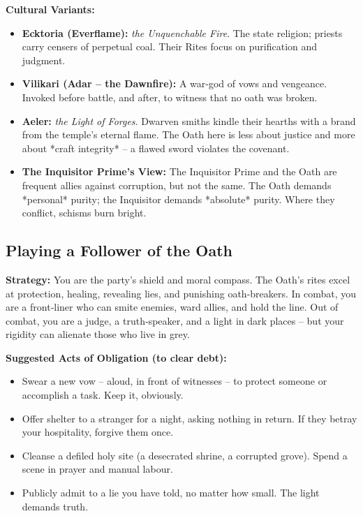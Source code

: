 \documentclass[10pt,a5paper]{book}
\begin{document}
\textbf{Cultural Variants:}
\begin{itemize}
    \item \textbf{Ecktoria (Everflame):} \textit{the Unquenchable Fire}. The state religion; priests carry censers of perpetual coal. Their Rites focus on purification and judgment.
    \item \textbf{Vilikari (Adar – the Dawnfire):} A war‑god of vows and vengeance. Invoked before battle, and after, to witness that no oath was broken.
    \item \textbf{Aeler:} \textit{the Light of Forges}. Dwarven smiths kindle their hearths with a brand from the temple’s eternal flame. The Oath here is less about justice and more about *craft integrity* – a flawed sword violates the covenant.
    \item \textbf{The Inquisitor Prime’s View:} The Inquisitor Prime and the Oath are frequent allies against corruption, but not the same. The Oath demands *personal* purity; the Inquisitor demands *absolute* purity. Where they conflict, schisms burn bright.
\end{itemize}

\subsection*{Playing a Follower of the Oath}

\textbf{Strategy:} You are the party’s shield and moral compass. The Oath’s rites excel at protection, healing, revealing lies, and punishing oath‑breakers. In combat, you are a front‑liner who can smite enemies, ward allies, and hold the line. Out of combat, you are a judge, a truth‑speaker, and a light in dark places – but your rigidity can alienate those who live in grey.

\textbf{Suggested Acts of Obligation (to clear debt):}
\begin{itemize}
    \item Swear a new vow – aloud, in front of witnesses – to protect someone or accomplish a task. Keep it, obviously.
    \item Offer shelter to a stranger for a night, asking nothing in return. If they betray your hospitality, forgive them once.
    \item Cleanse a defiled holy site (a desecrated shrine, a corrupted grove). Spend a scene in prayer and manual labour.
    \item Publicly admit to a lie you have told, no matter how small. The light demands truth.
\end{itemize}
\end{document}
